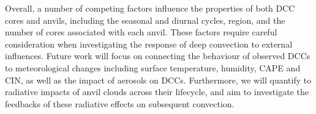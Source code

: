 Overall, a number of competing factors influence the properties of both DCC cores and anvils, including the seasonal and diurnal cycles, region, and the number of cores associated with each anvil.
These factors require careful consideration when investigating the response of deep convection to external influences.
Future work will focus on connecting the behaviour of observed DCCs to meteorological changes including surface temperature, humidity, CAPE and CIN, as well as the impact of aerosols on DCCs.
Furthermore, we will quantify to radiative impacts of anvil clouds across their lifecycle, and aim to investigate the feedbacks of these radiative effects on subsequent convection.

